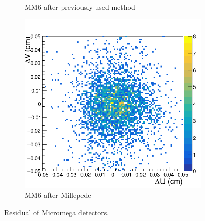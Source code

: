 \begin{figure}[h!]
\begin{subfigure}[l]{.45\textwidth}
   \caption{MM6 after previously used method}
   \label{fig:MX6_after_prev}
 \end{subfigure}
 \begin{subfigure}[r]{.45\textwidth}
   \centering
   \includegraphics[width=\linewidth]{thesis_figures/alignment/Run_3211_after_millepede/square/MX7.png}
   \caption{MM6 after Millepede}
 \end{subfigure}
 \caption{Residual of Micromega detectors.}
\end{figure}


